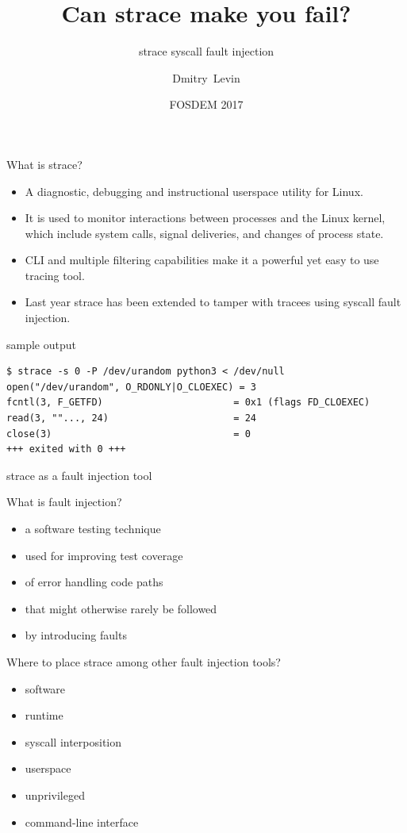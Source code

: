 \documentclass[unicode]{beamer}
\title{\Huge Can strace make you fail?}
\subtitle{\huge strace syscall fault injection}
\author{\Huge Dmitry~Levin}
\date{FOSDEM 2017}
\begin{document}
\begin{frame}
\titlepage
\end{frame}

\begin{frame}[fragile]{What is strace?}
\begin{itemize}
	\item A diagnostic, debugging and instructional userspace
	utility for Linux.

	\item It is used to monitor interactions between processes and
	the Linux kernel, which include system calls, signal
	deliveries, and changes of process state.

	\item CLI and multiple filtering capabilities make it a powerful
	yet easy to use tracing tool.

	\item Last year strace has been extended to tamper with tracees
	using syscall fault injection.
\end{itemize}
\scriptsize
\begin{block}{\large sample output}
\begin{verbatim}
$ strace -s 0 -P /dev/urandom python3 < /dev/null
open("/dev/urandom", O_RDONLY|O_CLOEXEC) = 3
fcntl(3, F_GETFD)                       = 0x1 (flags FD_CLOEXEC)
read(3, ""..., 24)                      = 24
close(3)                                = 0
+++ exited with 0 +++
\end{verbatim}
\end{block}
\end{frame}

\begin{frame}{strace as a fault injection tool}
\begin{block}{\large What is fault injection?}
	\begin{itemize}
	\item a software testing technique
	\item used for improving test coverage
	\item of error handling code paths
	\item that might otherwise rarely be followed
	\item by introducing faults
	\end{itemize}
\end{block}
\begin{block}{\large Where to place strace among other fault injection tools?}
	\begin{itemize}
		\item software
		\item runtime
		\item syscall interposition
		\item userspace
		\item unprivileged
		\item command-line interface
	\end{itemize}
\end{block}
\end{frame}
\end{document}
